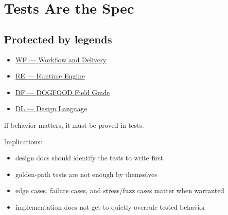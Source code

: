 \chapter{Tests Are the Spec}\label{record-061}

\smallskip

\section{Protected by legends}\label{record-061-protected-by-legends}

\begin{itemize}
\tightlist
\item
  \href{https://github.com/flyingrobots/bijou/blob/1853ad902f6bf219326409e7f743a5a1d6517dbc/docs/legends/WF-workflow-and-delivery.md}{WF --- Workflow and Delivery}
\item
  \href{https://github.com/flyingrobots/bijou/blob/1853ad902f6bf219326409e7f743a5a1d6517dbc/docs/legends/RE-runtime-engine.md}{RE --- Runtime Engine}
\item
  \href{https://github.com/flyingrobots/bijou/blob/1853ad902f6bf219326409e7f743a5a1d6517dbc/docs/legends/DF-dogfood-field-guide.md}{DF --- DOGFOOD Field Guide}
\item
  \href{https://github.com/flyingrobots/bijou/blob/1853ad902f6bf219326409e7f743a5a1d6517dbc/docs/legends/DL-design-language.md}{DL --- Design Language}
\end{itemize}

If behavior matters, it must be proved in tests.

Implications:

\begin{itemize}
\tightlist
\item
  design docs should identify the tests to write first
\item
  golden-path tests are not enough by themselves
\item
  edge cases, failure cases, and stress/fuzz cases matter when warranted
\item
  implementation does not get to quietly overrule tested behavior
\end{itemize}

